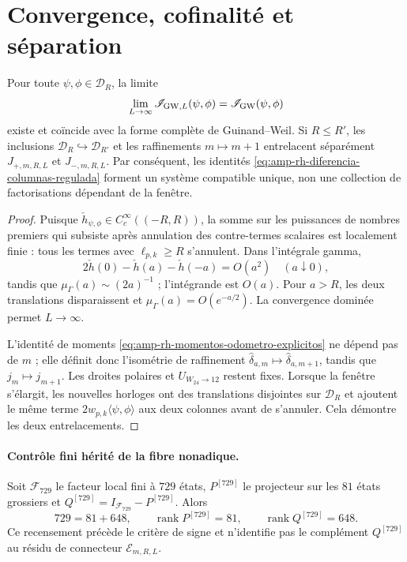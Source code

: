 \section*{Convergence, cofinalité et séparation}

\begin{proposition}
\label{prop:amp-rh-convergencia-cofinal}
Pour toute \(\psi,\phi\in\mathcal D_R\), la limite
\[
 \lim_{L\to\infty}\mathscr I_{{\rm GW},L}(\psi,\phi)
 =\mathscr I_{\rm GW}(\psi,\phi)
\]
existe et coïncide avec la forme complète de Guinand--Weil. Si \(R\leq R'\), les inclusions \(\mathcal D_R\hookrightarrow\mathcal D_{R'}\) et les raffinements \(m\mapsto m+1\) entrelacent séparément \(J_{+,m,R,L}\) et \(J_{-,m,R,L}\). Par conséquent, les identités \eqref{eq:amp-rh-diferencia-columnas-regulada} forment un système compatible unique, non une collection de factorisations dépendant de la fenêtre.
\end{proposition}

\begin{proof}
Puisque \(\check h_{\psi,\phi}\in C_c^\infty((-R,R))\), la somme sur les puissances de nombres premiers qui subsiste après annulation des contre-termes scalaires est localement finie : tous les termes avec \(\ell_{p,k}\geq R\) s'annulent. Dans l'intégrale gamma,
\[
 2\check h(0)-\check h(a)-\check h(-a)=O(a^2)
 \quad(a\downarrow0),
\]
tandis que \(\mu_\Gamma(a)\sim(2a)^{-1}\) ; l'intégrande est \(O(a)\). Pour \(a>R\), les deux translations disparaissent et \(\mu_\Gamma(a)=O(e^{-a/2})\). La convergence dominée permet \(L\to\infty\).

L'identité de moments \eqref{eq:amp-rh-momentos-odometro-explicitos} ne dépend pas de \(m\) ; elle définit donc l'isométrie de raffinement \(\widehat\delta_{a,m}\mapsto\widehat\delta_{a,m+1}\), tandis que \(j_m\mapsto j_{m+1}\). Les droites polaires et \(U_{W_{24}\to12}\) restent fixes. Lorsque la fenêtre s'élargit, les nouvelles horloges ont des translations disjointes sur \(\mathcal D_R\) et ajoutent le même terme \(2w_{p,k}\langle\psi,\phi\rangle\) aux deux colonnes avant de s'annuler. Cela démontre les deux entrelacements.
\end{proof}

\paragraph{Contrôle fini hérité de la fibre nonadique.}
Soit \(\mathscr F_{729}\) le facteur local fini à \(729\) états, \(P^{[729]}\) le projecteur sur les \(81\) états grossiers et \(Q^{[729]}=I_{\mathscr F_{729}}-P^{[729]}\). Alors
\begin{equation}\label{eq:amp-rh-729-81-648}
 729=81+648,\qquad
 \operatorname{rank}P^{[729]}=81,\qquad
 \operatorname{rank}Q^{[729]}=648.
\end{equation}
Ce recensement précède le critère de signe et n'identifie pas le complément \(Q^{[729]}\) au résidu de connecteur \(\mathcal E_{m,R,L}\).

